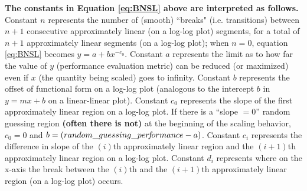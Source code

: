\documentclass{article} %
\begin{document}
\vspace*{-14.956mm}

\textbf{The constants in Equation \ref{eq:BNSL} above are interpreted as follows.} Constant $n$ represents the number of (smooth) ``breaks" (i.e. transitions) between $n+1$ consecutive approximately linear (on a log-log plot) segments, for a total of $n+1$  approximately linear segments (on a log-log plot); 
when $n=0$, equation \ref{eq:BNSL} becomes $y=a+bx^{-c_0}$.
Constant $a$ represents the limit as to how far the value of $y$ (performance evaluation metric) can be reduced (or maximized) even if $x$ (the quantity being scaled) goes to infinity. Constant $b$ represents the offset of functional form on a log-log plot (analogous to the intercept $b$ in $y=mx+b$ on a linear-linear plot). Constant $c_0$ represents the slope of the first approximately linear region on a log-log plot. If there is a ``slope $=0$'' random guessing region \textbf{(often there is not)} at the beginning of the scaling behavior, $c_0=0$ and $b = (random\_guessing\_per\hspace{-.6mm}f\hspace{-.6mm}ormance - a)$. Constant $c_i$ represents the difference in slope of the $(i)$th approximately linear region and the $(i+1)$th approximately linear region on a log-log plot. Constant $d_i$ represents where on the x-axis the break between the $(i)$th and the $(i+1)$th approximately linear region (on a log-log plot) occurs. %
\end{document}

